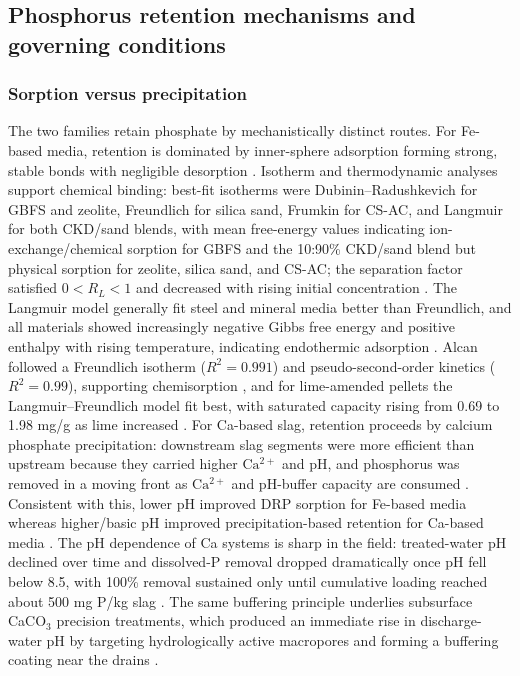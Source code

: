 \documentclass[11pt]{article}
\begin{document}
\subsection{Phosphorus retention mechanisms and governing conditions}

\subsubsection{Sorption versus precipitation}

The two families retain phosphate by mechanistically distinct routes. For Fe-based media, retention is dominated by inner-sphere adsorption forming strong, stable bonds with negligible desorption \parencite{Mendes2022}. Isotherm and thermodynamic analyses support chemical binding: best-fit isotherms were Dubinin--Radushkevich for GBFS and zeolite, Freundlich for silica sand, Frumkin for CS-AC, and Langmuir for both CKD/sand blends, with mean free-energy values indicating ion-exchange/chemical sorption for GBFS and the 10:90\% CKD/sand blend but physical sorption for zeolite, silica sand, and CS-AC; the separation factor satisfied $0 < R_L < 1$ and decreased with rising initial concentration \parencite{Agrawal2011}. The Langmuir model generally fit steel and mineral media better than Freundlich, and all materials showed increasingly negative Gibbs free energy and positive enthalpy with rising temperature, indicating endothermic adsorption \parencite{Sellner2019b}. Alcan followed a Freundlich isotherm ($R^2=0.991$) and pseudo-second-order kinetics ($R^2=0.99$), supporting chemisorption \parencite{Kumari2025}, and for lime-amended pellets the Langmuir--Freundlich model fit best, with saturated capacity rising from 0.69 to 1.98 mg/g as lime increased \parencite{Li2017}. For Ca-based slag, retention proceeds by calcium phosphate precipitation: downstream slag segments were more efficient than upstream because they carried higher $\mathrm{Ca^{2+}}$ and pH, and phosphorus was removed in a moving front as $\mathrm{Ca^{2+}}$ and pH-buffer capacity are consumed \parencite{Wang2020d}. Consistent with this, lower pH improved DRP sorption for Fe-based media whereas higher/basic pH improved precipitation-based retention for Ca-based media \parencite{Mendes2022}. The pH dependence of Ca systems is sharp in the field: treated-water pH declined over time and dissolved-P removal dropped dramatically once pH fell below 8.5, with 100\% removal sustained only until cumulative loading reached about 500 mg P/kg slag \parencite{Penn2020}. The same buffering principle underlies subsurface CaCO$_3$ precision treatments, which produced an immediate rise in discharge-water pH by targeting hydrologically active macropores and forming a buffering coating near the drains \parencite{Dalhem2019}.
\end{document}
